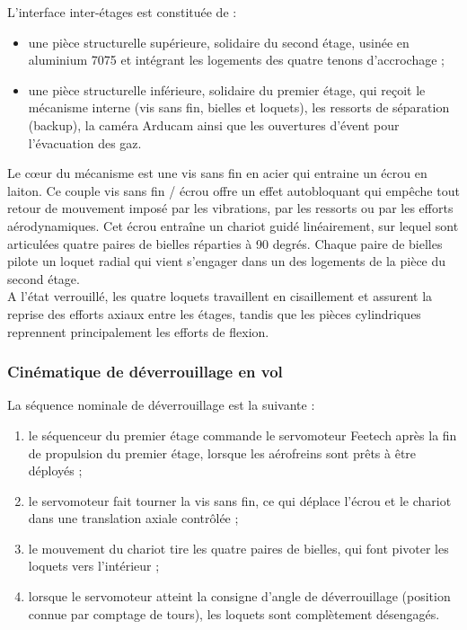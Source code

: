L'interface inter-étages est constituée de :
\begin{itemize}
    \item une pièce structurelle supérieure, solidaire du second étage, usinée en aluminium 7075 et intégrant les logements des
    quatre tenons d'accrochage ;
    \item une pièce structurelle inférieure, solidaire du premier étage, qui reçoit le mécanisme interne (vis sans fin, bielles
    et loquets), les ressorts de séparation (backup), la caméra Arducam ainsi que les ouvertures d'évent pour l'évacuation des
    gaz.\\
\end{itemize}

Le cœur du mécanisme est une vis sans fin en acier qui entraine un écrou en laiton. Ce couple vis sans fin / écrou offre un
effet autobloquant qui empêche tout retour de mouvement imposé par les vibrations, par les ressorts ou par les efforts
aérodynamiques. Cet écrou entraîne un chariot guidé linéairement, sur lequel sont articulées quatre paires de bielles réparties
à 90 degrés. Chaque paire de bielles pilote un loquet radial qui vient s'engager dans un des logements de la pièce du second
étage.\\

A l'état verrouillé, les quatre loquets travaillent en cisaillement et assurent la reprise des efforts axiaux entre les étages,
tandis que les pièces cylindriques reprennent principalement les efforts de flexion.

\subsubsection{Cinématique de déverrouillage en vol}

La séquence nominale de déverrouillage est la suivante :
\begin{enumerate}
    \item le séquenceur du premier étage commande le servomoteur Feetech après la fin de propulsion du premier étage, lorsque
    les aérofreins sont prêts à être déployés ;
    \item le servomoteur fait tourner la vis sans fin, ce qui déplace l'écrou et le chariot dans une translation axiale contrôlée ;
    \item le mouvement du chariot tire les quatre paires de bielles, qui font pivoter les loquets vers l'intérieur ;
    \item lorsque le servomoteur atteint la consigne d'angle de déverrouillage (position connue par comptage de tours), les
    loquets sont complètement désengagés.\\
\end{enumerate}

